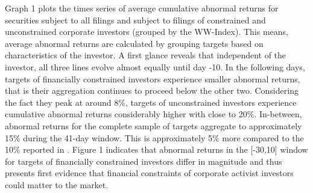 \documentclass[12pt]{article}
\begin{document}
Graph 1 plots the times series of average cumulative abnormal returns for securities subject to all filings and subject to filings of constrained and unconstrained corporate investors (grouped by the WW-Index). This means, average abnormal returns are calculated by grouping targets based on characteristics of the investor. A first glance reveals that independent of the investor, all three lines evolve almost equally until day -10. In the following days, targets of financially constrained investors experience smaller abnormal returns, that is their aggregation continues to proceed below the other two. Considering the fact they peak at around 8\%, targets of unconstrained investors experience cumulative abnormal returns considerably higher with close to 20\%. In-between, abnormal returns for the complete sample of targets aggregate to approximately 15\% during the 41-day window. This is approximately 5\% more compared to the 10\% reported in \citet[p.1563]{Collin-Dufresne2015}. 
Figure 1 indicates that abnormal returns in the [-30,10] window for targets of financially constrained investors differ in magnitude and thus presents first evidence that financial constraints of corporate activist investors could matter to the market.
\end{document}
